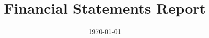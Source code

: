 \documentclass{article}
\begin{document}
\title{Financial Statements Report}
\date{\today}
\maketitle

\end{document}
